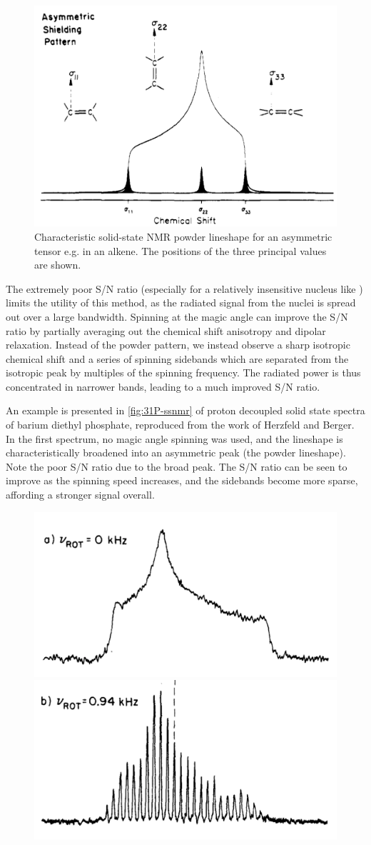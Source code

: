 \begin{refsection}
\begin{figure}
  \centering
  \includegraphics[width=0.45\linewidth]{Figures/ssnmr-tensor.pdf}
  \caption{Characteristic solid-state NMR powder lineshape for an asymmetric tensor e.g. in an alkene. The positions of the three principal values are shown.}
  \label{fig:ssnmr-tensor}
\end{figure}

The extremely poor S/N ratio (especially for a relatively insensitive nucleus like ) limits the utility of this method, as the radiated signal from the nuclei is spread out over a large bandwidth.
Spinning at the magic angle can improve the S/N ratio by partially averaging out the chemical shift anisotropy and dipolar relaxation.
Instead of the powder pattern, we instead observe a sharp isotropic chemical shift and a series of spinning sidebands which are separated from the isotropic peak by multiples of the spinning frequency.
The radiated power is thus concentrated in narrower bands, leading to a much improved S/N ratio.

An example is presented in \cref{fig:31P-ssnmr} of proton decoupled solid state  spectra of barium diethyl phosphate, reproduced from the work of Herzfeld and Berger\autocite{Herzfeld1980SidebandAngle}.
In the first spectrum, no magic angle spinning was used, and the lineshape is characteristically broadened into an asymmetric peak (the powder lineshape).
Note the poor S/N ratio due to the broad peak.
The S/N ratio can be seen to improve as the spinning speed increases, and the sidebands become more sparse, affording a stronger signal overall.

\begin{figure}
    \centering
    \includegraphics[width=0.45\linewidth]{Figures/31P-ssnmr-0khz.pdf}
    \includegraphics[width=0.45\linewidth]{Figures/31P-ssnmr-0.94khz.pdf}


\end{figure}
\end{refsection}
